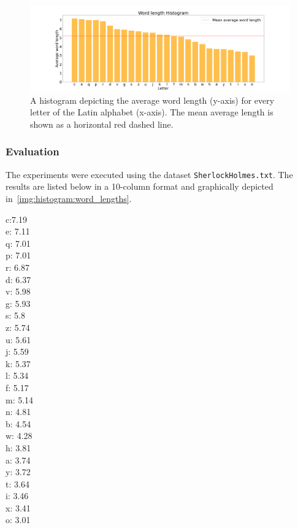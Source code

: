 \documentclass[acmlarge]{acmart}
\begin{document}
  \begin{figure}[tb!]
    \centering
    \includegraphics[width=\linewidth]{figures/wordLengthHistogram}
    \caption{A histogram depicting the average word length (y-axis) for every letter of the Latin alphabet (x-axis). The mean average length is shown as a horizontal red dashed line.}
    \label{img:histogram:word_lengths}
  \end{figure}
  

  \subsubsection{Evaluation}
  The experiments were executed using the dataset \texttt{SherlockHolmes.txt}. The results are listed below in a 10-column format and graphically depicted in~\autoref{img:histogram:word_lengths}.

  \begin{multicols}{10}
    \noindent
    c:7.19
    \\ e: 7.11
    \\ q: 7.01
    \\ p: 7.01
    \\ r: 6.87
    \\ d: 6.37
    \\ v: 5.98
    \\ g: 5.93
    \\ s: 5.8
    \\ z: 5.74
    \\ u: 5.61
    \\ j: 5.59
    \\ k: 5.37
    \\ l: 5.34
    \\ f: 5.17
    \\ m: 5.14
    \\ n: 4.81
    \\ b: 4.54
    \\ w: 4.28
    \\ h: 3.81
    \\ a: 3.74
    \\ y: 3.72
    \\ t: 3.64
    \\ i: 3.46
    \\ x: 3.41
    \\ o: 3.01
    \label{multicol:test}
  \end{multicols}
\end{document}
